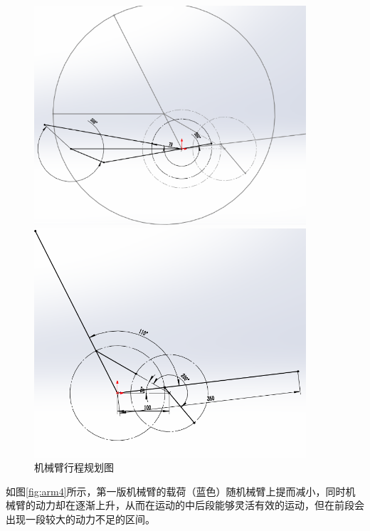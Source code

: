 \begin{figure}[ht]
\begin{minipage}[t]{0.5\textwidth}
    \centering
    \includegraphics[width = 0.9\textwidth]{images/arm_2.png}
\end{minipage}
\begin{minipage}[t]{0.5\textwidth}
    \centering
    \includegraphics[width = 0.9\textwidth]{images/arm_3.png}
\end{minipage}
\caption{机械臂行程规划图}
\label{fig:arm2}
\end{figure}

如图\ref{fig:arm4}所示，第一版机械臂的载荷（蓝色）随机械臂上提而减小，同时机械臂的动力却在逐渐上升，从而在运动的中后段能够灵活有效的运动，但在前段会出现一段较大的动力不足的区间。

